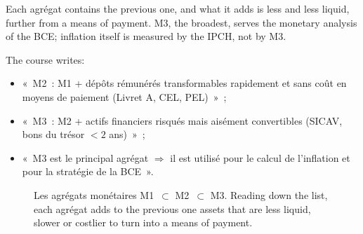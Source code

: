 Each agrégat contains the previous one, and what it adds is less and less
liquid, further from a means of payment. M3, the broadest, serves the monetary
analysis of the BCE; inflation itself is measured by the IPCH, not by M3.

\begin{remark}
  The course writes:
  \begin{itemize}
    \item «~M2~: M1 + dépôts rémunérés transformables rapidement et sans coût en
      moyens de paiement (Livret A, CEL, PEL)~»~;
    \item «~M3~: M2 + actifs financiers risqués mais aisément convertibles (SICAV,
      bons du trésor $< 2$ ans)~»~;
    \item «~M3 est le principal agrégat $\Rightarrow$ il est utilisé pour le
      calcul de l'inflation et pour la stratégie de la BCE~».
  \end{itemize}
\end{remark}

\begin{figure}[h!]
  \centering
  \caption*{\small Les agrégats monétaires M1~$\subset$ M2~$\subset$ M3. Reading
    down the list, each agrégat adds to the previous one assets that are less
    liquid, slower or costlier to turn into a means of payment.}
\end{figure}

